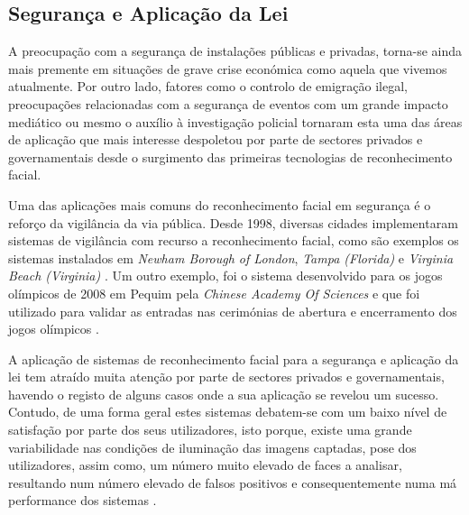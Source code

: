 \subsection{Segurança e Aplicação da Lei} \label{sec:SegurancaAplicaçãoLei}
A preocupação com a segurança de instalações públicas e privadas, torna-se ainda mais premente em situações de grave crise económica como aquela que vivemos atualmente. Por outro lado, fatores como o controlo de emigração ilegal, preocupações relacionadas com a segurança de eventos com um grande impacto mediático ou mesmo o auxílio à investigação policial tornaram esta uma das áreas de aplicação que mais interesse despoletou por parte de sectores privados e governamentais desde o surgimento das primeiras tecnologias de reconhecimento facial.

Uma das aplicações mais comuns do reconhecimento facial em segurança é o reforço da vigilância da via pública. Desde 1998, diversas cidades implementaram sistemas de vigilância com recurso a reconhecimento facial, como são exemplos os sistemas instalados em \textit{Newham Borough of London}, \textit{Tampa (Florida)} e \textit{Virginia Beach (Virginia)} \citep{Li2011}.
Um outro exemplo, foi o sistema desenvolvido para os jogos olímpicos de 2008 em Pequim pela \textit{Chinese Academy Of Sciences} e que foi utilizado para validar as entradas nas cerimónias de abertura e encerramento dos jogos olímpicos \cite{ChineseAcademyOfSciences}.

A aplicação de sistemas de reconhecimento facial para a segurança e aplicação da lei tem atraído muita atenção por parte de sectores privados e governamentais, havendo o registo de alguns casos onde a sua aplicação se revelou um sucesso. Contudo, de uma forma geral estes sistemas debatem-se com um baixo nível de satisfação por parte dos seus utilizadores, isto porque, existe uma grande variabilidade nas condições de iluminação das imagens captadas, pose dos utilizadores, assim como, um número muito elevado de faces a analisar, resultando num número elevado de falsos positivos e consequentemente numa má performance dos sistemas \citep{Li2011}.

